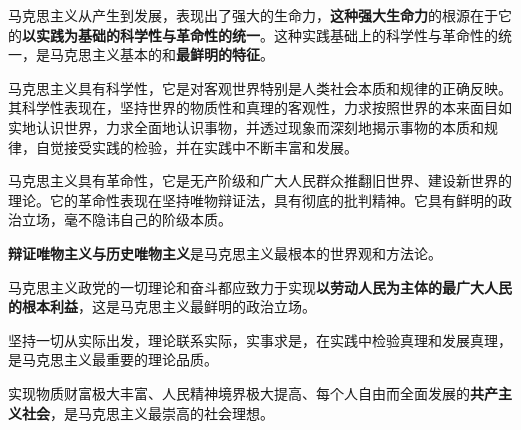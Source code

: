 马克思主义从产生到发展，表现出了强大的生命力，\textbf{{这种强大生命力}}的{根源}在于它的{\textbf{以实践为基础的科学性与革命性的统一}}。这种实践基础上的科学性与革命性的统一，是马克思主义基本的和{\textbf{最鲜明的特征}}。

{马克思主义具有{科学性}，它是对客观世界特别是人类社会{本质和规律的正确反映}。其科学性表现在，坚持世界的物质性和真理的客观性，力求按照世界的本来面目如实地认识世界，力求全面地认识事物，并透过现象而深刻地揭示事物的本质和规律，自觉接受实践的检验，并在实践中不断丰富和发展。}

{马克思主义具有{革命性}，它是无产阶级和广大人民群众推翻旧世界、建设新世界的理论。它的革命性表现在坚持唯物辩证法，具有彻底的批判精神。它具有鲜明的政治立场，毫不隐讳自己的阶级本质。}

{\textbf{{辩证唯物主义与历史唯物主义}}是马克思主义{最根本的世界观和方法论}。}

{马克思主义政党的一切理论和奋斗都应致力于实现\textbf{{以劳动人民为主体的最广大人民的根本利益}}，这是马克思主义{最鲜明的政治立场}。}

{坚持一切从实际出发，理论联系实际，实事求是，在实践中检验真理和发展真理，是马克思主义最重要的理论品质。}

{实现物质财富极大丰富、人民精神境界极大提高、每个人自由而全面发展的\textbf{{共产主义社会}}，是马克思主义{最崇高的社会理想。}}
